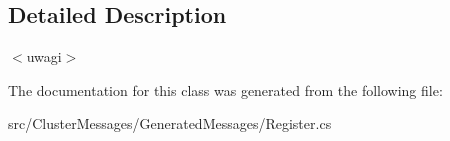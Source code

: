 \subsection{Detailed Description}
$<$uwagi$>$ 

The documentation for this class was generated from the following file\+:\begin{DoxyCompactItemize}
\item 
src/\+Cluster\+Messages/\+Generated\+Messages/Register.\+cs\end{DoxyCompactItemize}
